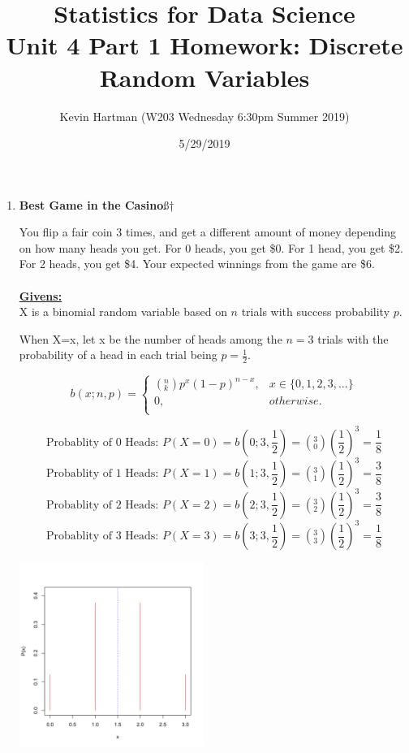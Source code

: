 \documentclass[12pt,a4paper]{article}
\numberwithin{equation}{subsection}
\begin{document}


\author{Kevin Hartman (W203 Wednesday 6:30pm Summer 2019)}
\date{5/29/2019}
\title{Statistics for Data Science \\
       Unit 4 Part 1 Homework: Discrete Random Variables}
\maketitle


\begin{enumerate}

\item \textbf{Best Game in the Casino}ß†

You flip a fair coin 3 times, and get a different amount of money depending on how many heads you get. For 0 heads, you get \$0. For 1 head, you get \$2. For 2 heads, you get \$4. Your expected winnings from the game are \$6. 
\\
\\
\textbf{\underline{Givens:}}
\\
X is a binomial random variable based on $n$ trials with success probability $p$.

When X=x, let x be the number of heads among the $n=3$ trials with the probability of a head in each trial being $p=\frac{1}{2}$.

$$b(x;n,p) = \begin{cases}
(^n_k)p^x(1-p)^{n-x}, &x \in \{0,1,2,3,...\}\\
0, &otherwise.\\
\end{cases}
$$

$$\text{Probablity of 0 Heads: }P(X=0)=b(0;3,\frac{1}{2}) = (^3_0)(\frac{1}{2})^3 = \frac{1}{8}$$
$$\text{Probablity of 1 Heads: }P(X=1)=b(1;3,\frac{1}{2}) = (^3_1)(\frac{1}{2})^3 = \frac{3}{8}$$
$$\text{Probablity of 2 Heads: }P(X=2)=b(2;3,\frac{1}{2}) = (^3_2)(\frac{1}{2})^3 = \frac{3}{8}$$
$$\text{Probablity of 3 Heads: }P(X=3)=b(3;3,\frac{1}{2}) = (^3_3)(\frac{1}{2})^3 = \frac{1}{8}$$


\begin{minipage}{\linewidth}
  \centering
  \includegraphics[width=6cm]{Kevin_Hartman_unit_4_part_1_hw-xbinom}
\end{minipage}


\end{enumerate}
\end{document}
